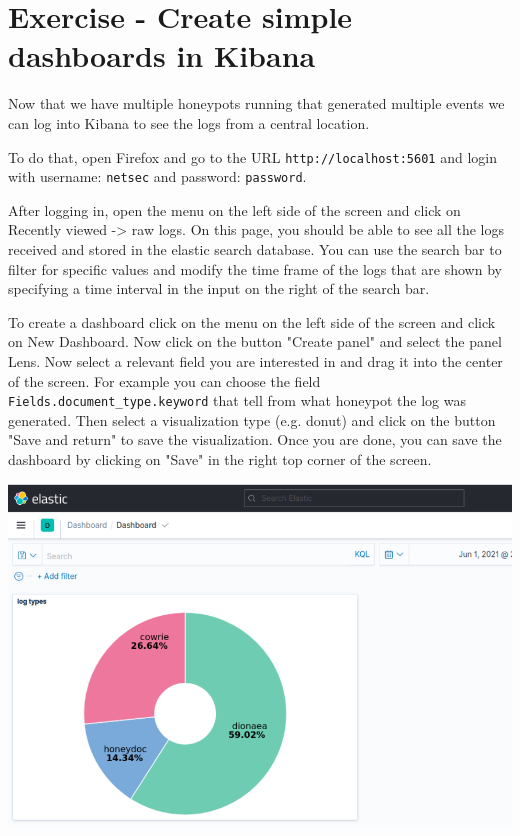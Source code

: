 \documentclass[epsfig,a4paper,11pt,titlepage,oneside,openany]{book}
\begin{document}
\section{Exercise - Create simple dashboards in Kibana}

Now that we have multiple honeypots running that generated multiple events we can log into Kibana to see the logs from a central location.

To do that, open Firefox and go to the URL \texttt{http://localhost:5601} and login with username: \texttt{netsec} and password: \texttt{password}.

After logging in, open the menu on the left side of the screen and click on Recently viewed -> raw logs. On this page, you should be able to see all the logs received and stored in the elastic search database. You can use the search bar to filter for specific values and modify the time frame of the logs that are shown by specifying a time interval in the input on the right of the search bar.

To create a dashboard click on the menu on the left side of the screen and click on New Dashboard. Now click on the button "Create panel" and select the panel Lens. Now select a relevant field you are interested in and drag it into the center of the screen. For example you can choose the field \texttt{Fields.document\_type.keyword} that tell from  what honeypot the log was generated. Then select a visualization type (e.g. donut) and click on the button "Save and return" to save the visualization. Once you are done, you can save the dashboard by clicking on "Save" in the right top corner of the screen.

\begin{center}
\includegraphics[scale=0.35]{kibana}
\end{center}
\end{document}

